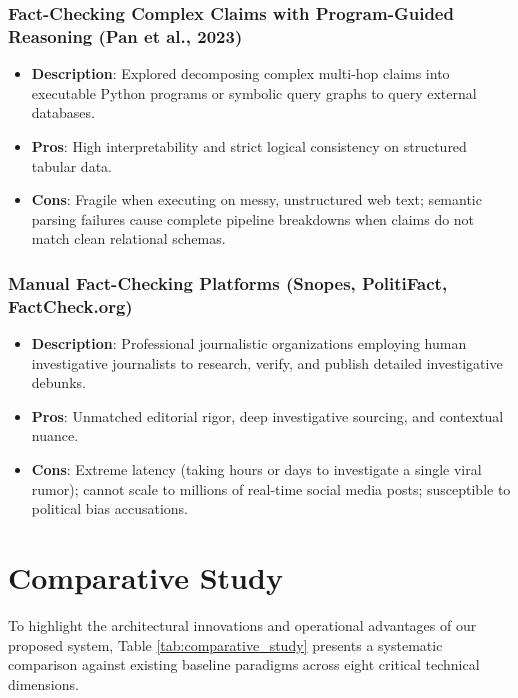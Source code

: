 \documentclass[12pt,a4paper]{report}
\begin{document}
\subsection{Fact-Checking Complex Claims with Program-Guided Reasoning (Pan et al., 2023)}
\begin{itemize}
    \item \textbf{Description}: Explored decomposing complex multi-hop claims into executable Python programs or symbolic query graphs to query external databases.
    \item \textbf{Pros}: High interpretability and strict logical consistency on structured tabular data.
    \item \textbf{Cons}: Fragile when executing on messy, unstructured web text; semantic parsing failures cause complete pipeline breakdowns when claims do not match clean relational schemas.
\end{itemize}

\subsection{Manual Fact-Checking Platforms (Snopes, PolitiFact, FactCheck.org)}
\begin{itemize}
    \item \textbf{Description}: Professional journalistic organizations employing human investigative journalists to research, verify, and publish detailed investigative debunks.
    \item \textbf{Pros}: Unmatched editorial rigor, deep investigative sourcing, and contextual nuance.
    \item \textbf{Cons}: Extreme latency (taking hours or days to investigate a single viral rumor); cannot scale to millions of real-time social media posts; susceptible to political bias accusations.
\end{itemize}

\chapter{Comparative Study}

To highlight the architectural innovations and operational advantages of our proposed system, Table \ref{tab:comparative_study} presents a systematic comparison against existing baseline paradigms across eight critical technical dimensions.
\end{document}

